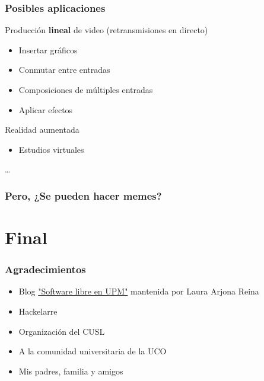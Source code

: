 \documentclass{beamer}
\begin{document}
\begin{frame}[t] \frametitle{Posibles aplicaciones}
	\begin{itemize}
		\begin{item}
			Producción \textbf{lineal} de video (retransmisiones en directo)
			\begin{itemize}
				\item{Insertar gráficos}
				\item{Conmutar entre entradas}
				\item{Composiciones de múltiples entradas}
				\item{Aplicar efectos}
			\end{itemize}
		\end{item}
		\begin{item}
			Realidad aumentada
			\begin{itemize}
				\item{Estudios virtuales}
			\end{itemize}
		\end{item}
		\begin{item}
			\ldots
		\end{item}
	\end{itemize}
\end{frame}

\begin{frame} \frametitle{Pero, ¿Se pueden hacer memes?}
\end{frame}

%
%
\section{Final}

\begin{frame} \frametitle{Agradecimientos}
	\begin{itemize}
		\item{Blog \href{http://blogs.upm.es/softwarelibre/}{"Software libre en UPM"} mantenida por Laura Arjona Reina}
		\item{Hackelarre}
		\item{Organización del CUSL}
		\item{A la comunidad universitaria de la UCO}
		\item{Mis padres, familia y amigos}
	\end{itemize}
\end{frame}
\end{document}
